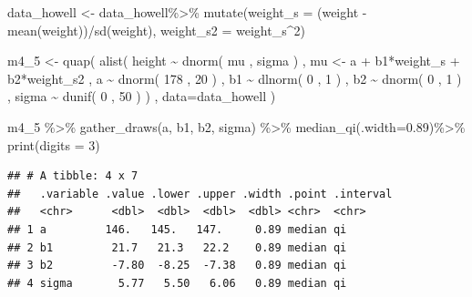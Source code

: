 \documentclass[
]{book}
\newenvironment{Shaded}{\begin{snugshade}}{\end{snugshade}}
\newcommand{\AttributeTok}[1]{\textcolor[rgb]{0.77,0.63,0.00}{#1}}
\newcommand{\DecValTok}[1]{\textcolor[rgb]{0.00,0.00,0.81}{#1}}
\newcommand{\FloatTok}[1]{\textcolor[rgb]{0.00,0.00,0.81}{#1}}
\newcommand{\FunctionTok}[1]{\textcolor[rgb]{0.00,0.00,0.00}{#1}}
\newcommand{\NormalTok}[1]{#1}
\newcommand{\OtherTok}[1]{\textcolor[rgb]{0.56,0.35,0.01}{#1}}
\newcommand{\SpecialCharTok}[1]{\textcolor[rgb]{0.00,0.00,0.00}{#1}}
\begin{document}
\begin{Shaded}
\begin{Highlighting}[]
\NormalTok{data\_howell }\OtherTok{\textless{}{-}}\NormalTok{ data\_howell}\SpecialCharTok{\%\textgreater{}\%}
  \FunctionTok{mutate}\NormalTok{(}\AttributeTok{weight\_s =}\NormalTok{ (weight }\SpecialCharTok{{-}} \FunctionTok{mean}\NormalTok{(weight))}\SpecialCharTok{/}\FunctionTok{sd}\NormalTok{(weight),}
         \AttributeTok{weight\_s2 =}\NormalTok{ weight\_s}\SpecialCharTok{\^{}}\DecValTok{2}\NormalTok{)}

\NormalTok{m4\_5 }\OtherTok{\textless{}{-}} \FunctionTok{quap}\NormalTok{(}
    \FunctionTok{alist}\NormalTok{(}
\NormalTok{        height }\SpecialCharTok{\textasciitilde{}} \FunctionTok{dnorm}\NormalTok{( mu , sigma ) ,}
\NormalTok{        mu }\OtherTok{\textless{}{-}}\NormalTok{ a }\SpecialCharTok{+}\NormalTok{ b1}\SpecialCharTok{*}\NormalTok{weight\_s }\SpecialCharTok{+}\NormalTok{ b2}\SpecialCharTok{*}\NormalTok{weight\_s2 ,}
\NormalTok{        a }\SpecialCharTok{\textasciitilde{}} \FunctionTok{dnorm}\NormalTok{( }\DecValTok{178}\NormalTok{ , }\DecValTok{20}\NormalTok{ ) ,}
\NormalTok{        b1 }\SpecialCharTok{\textasciitilde{}} \FunctionTok{dlnorm}\NormalTok{( }\DecValTok{0}\NormalTok{ , }\DecValTok{1}\NormalTok{ ) ,}
\NormalTok{        b2 }\SpecialCharTok{\textasciitilde{}} \FunctionTok{dnorm}\NormalTok{( }\DecValTok{0}\NormalTok{ , }\DecValTok{1}\NormalTok{ ) ,}
\NormalTok{        sigma }\SpecialCharTok{\textasciitilde{}} \FunctionTok{dunif}\NormalTok{( }\DecValTok{0}\NormalTok{ , }\DecValTok{50}\NormalTok{ )}
\NormalTok{    ) , }\AttributeTok{data=}\NormalTok{data\_howell )}

\NormalTok{m4\_5 }\SpecialCharTok{\%\textgreater{}\%}
  \FunctionTok{gather\_draws}\NormalTok{(a, b1, b2, sigma) }\SpecialCharTok{\%\textgreater{}\%}
  \FunctionTok{median\_qi}\NormalTok{(}\AttributeTok{.width=}\FloatTok{0.89}\NormalTok{)}\SpecialCharTok{\%\textgreater{}\%}
  \FunctionTok{print}\NormalTok{(}\AttributeTok{digits =} \DecValTok{3}\NormalTok{)}
\end{Highlighting}
\end{Shaded}

\begin{verbatim}
## # A tibble: 4 x 7
##   .variable .value .lower .upper .width .point .interval
##   <chr>      <dbl>  <dbl>  <dbl>  <dbl> <chr>  <chr>    
## 1 a         146.   145.   147.     0.89 median qi       
## 2 b1         21.7   21.3   22.2    0.89 median qi       
## 3 b2         -7.80  -8.25  -7.38   0.89 median qi       
## 4 sigma       5.77   5.50   6.06   0.89 median qi
\end{verbatim}
\end{document}
